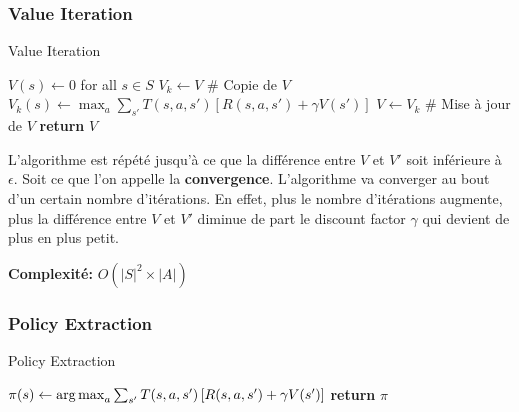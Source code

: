 \subsubsection{Value Iteration} %
\label{sec:value_iteration}

\begin{algorithm}[H]
    \caption{Value Iteration}\label{alg:valueiteration}
    \begin{algorithmic}[1]
            \State $V(s) \gets 0$ for all $s \in S$
            \Repeat
                \State $V_k \gets V$ \# Copie de $V$
                    \State $V_k(s) \gets \max_{a} \sum_{s'} T(s, a, s') \left[ R(s, a, s') + \gamma V(s') \right]$
                \EndFor
                \State $V \gets V_k$ \# Mise à jour de $V$
            \State \textbf{return} $V$
        \EndProcedure
    \end{algorithmic} 
\end{algorithm}

L'algorithme est répété jusqu'à ce que la différence entre $V$ et $V'$ soit inférieure à $\epsilon$. Soit 
ce que l'on appelle la \textbf{convergence}. L'algorithme va converger au bout d'un certain nombre d'itérations.
En effet, plus le nombre d'itérations augmente, plus la différence entre $V$ et $V'$ diminue de part le discount factor $\gamma$ qui devient 
de plus en plus petit.

\textbf{Complexité:} $O(|S|^2 \times |A|)$ 


\subsubsection{Policy Extraction} %
\label{sec:policy_extraction}

\begin{algorithm}[H]
    \caption{Policy Extraction}\label{alg:policyextraction}
    \begin{algorithmic}[1]
            \State $\pi(s) \gets \operatorname*{arg\,max}_{a} \sum_{s'} T(s, a, s') \left[ R(s, a, s') + \gamma V(s') \right]$
            \State \textbf{return} $\pi$
        \EndProcedure
    \end{algorithmic} 
\end{algorithm}


